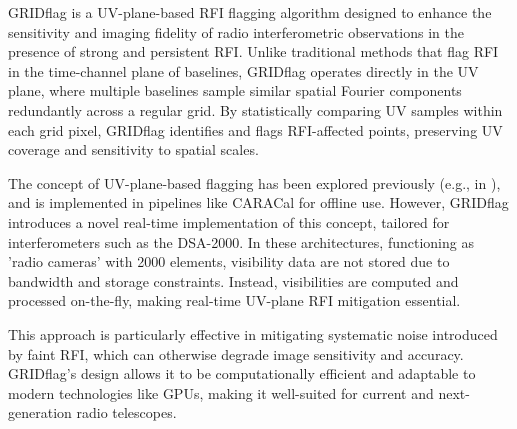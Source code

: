 GRIDflag \citep{10464448} is a UV-plane-based RFI flagging algorithm designed to enhance the sensitivity and imaging fidelity of radio interferometric observations in the presence of strong and persistent RFI. Unlike traditional methods that flag RFI in the time-channel plane of baselines, GRIDflag operates directly in the UV plane, where multiple baselines sample similar spatial Fourier components redundantly across a regular grid. By statistically comparing UV samples within each grid pixel, GRIDflag identifies and flags RFI-affected points, preserving UV coverage and sensitivity to spatial scales.

The concept of UV-plane-based flagging has been explored previously (e.g., in \citep{jozsa2020caracal}), and is implemented in pipelines like CARACal for offline use. However, GRIDflag introduces a novel real-time implementation of this concept, tailored for interferometers such as the DSA-2000. In these architectures, functioning as 'radio cameras' with 2000 elements, visibility data are not stored due to bandwidth and storage constraints. Instead, visibilities are computed and processed on-the-fly, making real-time UV-plane RFI mitigation essential.

This approach is particularly effective in mitigating systematic noise introduced by faint RFI, which can otherwise degrade image sensitivity and accuracy. GRIDflag's design allows it to be computationally efficient and adaptable to modern technologies like GPUs, making it well-suited for current and next-generation radio telescopes.

